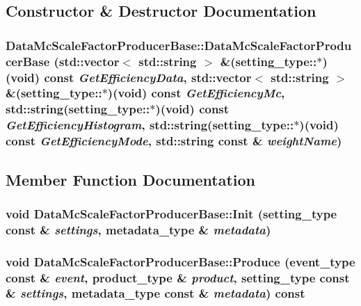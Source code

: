 \subsection{Constructor \& Destructor Documentation}
\hypertarget{classDataMcScaleFactorProducerBase_a65cea4e8f17fb545c66bd905c1816494}{
\subsubsection[{DataMcScaleFactorProducerBase}]{\setlength{\rightskip}{0pt plus 5cm}DataMcScaleFactorProducerBase::DataMcScaleFactorProducerBase (std::vector$<$ std::string $>$ \&(setting\_\-type::$\ast$)(void) const  {\em GetEfficiencyData}, \/  std::vector$<$ std::string $>$ \&(setting\_\-type::$\ast$)(void) const  {\em GetEfficiencyMc}, \/  std::string(setting\_\-type::$\ast$)(void) const  {\em GetEfficiencyHistogram}, \/  std::string(setting\_\-type::$\ast$)(void) const  {\em GetEfficiencyMode}, \/  std::string const \& {\em weightName})}}
\label{classDataMcScaleFactorProducerBase_a65cea4e8f17fb545c66bd905c1816494}


\subsection{Member Function Documentation}
\hypertarget{classDataMcScaleFactorProducerBase_a090986ea42a1af65a24615fb67dcc0d1}{
\subsubsection[{Init}]{\setlength{\rightskip}{0pt plus 5cm}void DataMcScaleFactorProducerBase::Init (setting\_\-type const \& {\em settings}, \/  metadata\_\-type \& {\em metadata})}}
\label{classDataMcScaleFactorProducerBase_a090986ea42a1af65a24615fb67dcc0d1}
\hypertarget{classDataMcScaleFactorProducerBase_a314d652b207ce5bd9b33472b2ee41429}{
\subsubsection[{Produce}]{\setlength{\rightskip}{0pt plus 5cm}void DataMcScaleFactorProducerBase::Produce (event\_\-type const \& {\em event}, \/  product\_\-type \& {\em product}, \/  setting\_\-type const \& {\em settings}, \/  metadata\_\-type const \& {\em metadata}) const}}
\label{classDataMcScaleFactorProducerBase_a314d652b207ce5bd9b33472b2ee41429}


